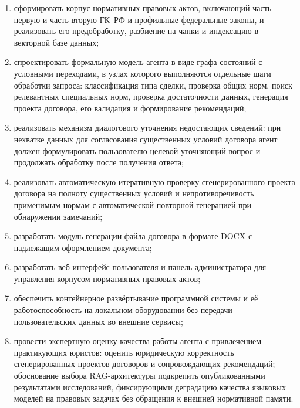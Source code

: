 \begin{enumerate}
    \item сформировать корпус нормативных правовых актов, включающий часть первую и часть вторую ГК~РФ и профильные федеральные законы, и реализовать его предобработку, разбиение на чанки и индексацию в векторной базе данных;
    \item спроектировать формальную модель агента в виде графа состояний с условными переходами, в узлах которого выполняются отдельные шаги обработки запроса: классификация типа сделки, проверка общих норм, поиск релевантных специальных норм, проверка достаточности данных, генерация проекта договора, его валидация и формирование рекомендаций;
    \item реализовать механизм диалогового уточнения недостающих сведений: при нехватке данных для согласования существенных условий договора агент должен формулировать пользователю целевой уточняющий вопрос и продолжать обработку после получения ответа;
    \item реализовать автоматическую итеративную проверку сгенерированного проекта договора на полноту существенных условий и непротиворечивость применимым нормам с автоматической повторной генерацией при обнаружении замечаний;
    \item разработать модуль генерации файла договора в формате DOCX с надлежащим оформлением документа;
    \item разработать веб-интерфейс пользователя и панель администратора для управления корпусом нормативных правовых актов;
    \item обеспечить контейнерное развёртывание программной системы и её работоспособность на локальном оборудовании без передачи пользовательских данных во внешние сервисы;
    \item провести экспертную оценку качества работы агента с привлечением практикующих юристов: оценить юридическую корректность сгенерированных проектов договоров и сопровождающих рекомендаций; обоснование выбора RAG-архитектуры подкрепить опубликованными результатами исследований, фиксирующими деградацию качества языковых моделей на правовых задачах без обращения к внешней нормативной памяти.
\end{enumerate}

